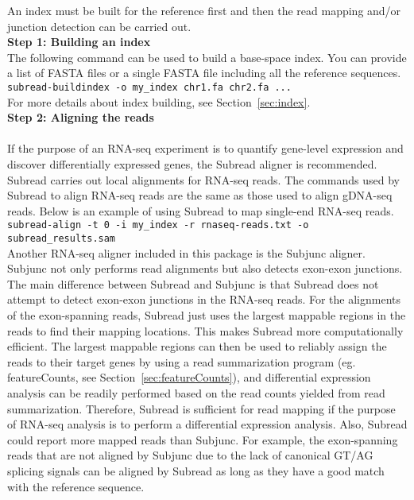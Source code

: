 \documentclass[12pt]{report}
\newcommand{\code}[1]{{\small\texttt{#1}}}
\newcommand{\Subread}{\textsf{Subread}}
\newcommand{\Subjunc}{\textsf{Subjunc}}
\newcommand{\featureCounts}{\textsf{featureCounts}}
\begin{document}
\label{sec:rnaseq-subread}
An index must be built for the reference first and then the read mapping and/or junction detection can be carried out.\\

{\noindent\bf Step 1: Building an index}\\

\noindent The following command can be used to build a base-space index.
You can provide a list of FASTA files or a single FASTA file including all the reference sequences.\\

\code{subread-buildindex -o my\_index chr1.fa chr2.fa ...}\\

\noindent For more details about index building, see Section~\ref{sec:index}.\\

{\noindent\bf Step 2: Aligning the reads}\\

\noindent{{\Subread}}\\

\noindent If the purpose of an RNA-seq experiment is to quantify gene-level expression and discover differentially expressed genes, the {\Subread} aligner is recommended.
{\Subread} carries out local alignments for RNA-seq reads.
The commands used by {\Subread} to align RNA-seq reads are the same as those used to align gDNA-seq reads.
Below is an example of using {\Subread} to map single-end RNA-seq reads.\\

\code{subread-align -t 0 -i my\_index -r rnaseq-reads.txt -o subread\_results.sam}\\

\noindent Another RNA-seq aligner included in this package is the {\Subjunc} aligner.
{\Subjunc} not only performs read alignments but also detects exon-exon junctions.
The main difference between {\Subread} and {\Subjunc} is that {\Subread} does not attempt to detect exon-exon junctions in the RNA-seq reads.
For the alignments of the exon-spanning reads, {\Subread} just uses the largest mappable regions in the reads to find their mapping locations.
This makes {\Subread} more computationally efficient.
The largest mappable regions can then be used to reliably assign the reads to their target genes by using a read summarization program (eg. \featureCounts, see Section~\ref{sec:featureCounts}), and differential expression analysis can be readily performed based on the read counts yielded from read summarization.
Therefore, {\Subread} is sufficient for read mapping if the purpose of RNA-seq analysis is to perform a differential expression analysis. 
Also, {\Subread} could report more mapped reads than {\Subjunc}.
For example, the exon-spanning reads that are not aligned by {\Subjunc} due to the lack of canonical GT/AG splicing signals can be aligned by {\Subread} as long as they have a good match with the reference sequence.\\
\end{document}
